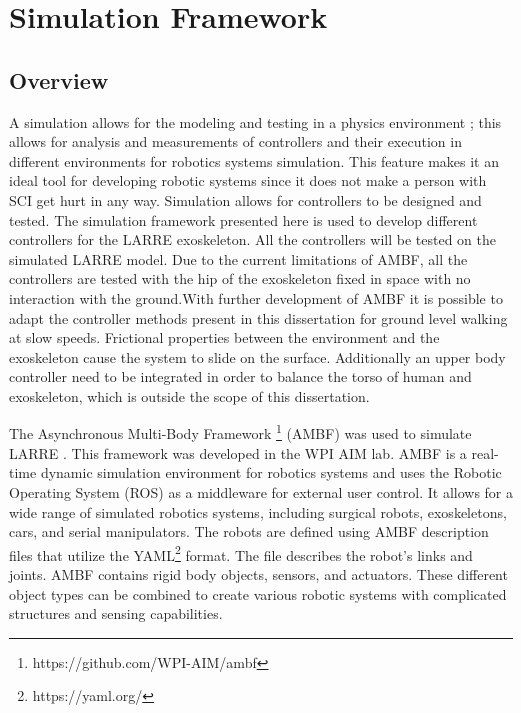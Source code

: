 \chapter{Simulation Framework}
\label{chap:sim}
\section{Overview}

A simulation allows for the modeling and testing in a physics environment \cite{vzlajpah2008simulation}; this allows for analysis and measurements of controllers and their execution in different environments for robotics systems simulation. This feature makes it an ideal tool for developing robotic systems since it does not make a person with SCI get hurt in any way. Simulation allows for controllers to be designed and tested. The simulation framework presented here is used to develop different controllers for the LARRE exoskeleton. All the controllers will be tested on the simulated LARRE model. Due to the current limitations of  AMBF, all the controllers are tested with the hip of the exoskeleton fixed in space with no interaction with the ground.With further development of AMBF it is possible to adapt the controller methods present in this dissertation for ground level walking at slow speeds. Frictional properties between the environment and the exoskeleton cause the system to slide on the surface. Additionally an upper body controller need to be integrated in order to balance the torso of human and exoskeleton, which is outside the scope of this dissertation. 


The Asynchronous Multi-Body Framework \footnote{https://github.com/WPI-AIM/ambf} (AMBF) was used to simulate LARRE \cite{AMBF}. This framework was developed in the WPI AIM lab. AMBF is a real-time dynamic simulation environment for robotics systems and uses the Robotic Operating System (ROS)\cite{quigley2009ros} as a middleware for external user control. It allows for a wide range of simulated robotics systems, including surgical robots, exoskeletons, cars, and serial manipulators. The robots are defined using AMBF description files that utilize the YAML\footnote{https://yaml.org/} format. The file describes the robot's links and joints. AMBF contains rigid body objects, sensors, and actuators. These different object types can be combined to create various robotic systems with complicated structures and sensing capabilities. 
 
